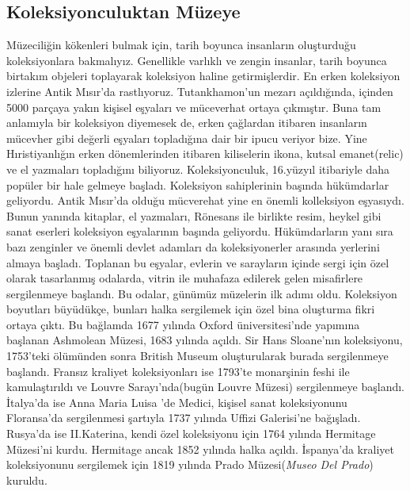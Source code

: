 \subsection{Koleksiyonculuktan Müzeye}
\indent\indent Müzeciliğin kökenleri bulmak için, tarih boyunca insanların oluşturduğu koleksiyonlara bakmalıyız. Genellikle varlıklı ve zengin insanlar, tarih boyunca birtakım objeleri toplayarak koleksiyon haline getirmişlerdir. En erken koleksiyon izlerine Antik Mısır'da rastlıyoruz. Tutankhamon'un mezarı açıldığında, içinden 5000 parçaya yakın kişisel eşyaları ve müceverhat ortaya çıkmıştır. Buna tam anlamıyla bir koleksiyon diyemesek de, erken çağlardan itibaren insanların mücevher gibi değerli eşyaları topladığına dair bir ipucu veriyor bize. Yine Hıristiyanlığın erken dönemlerinden itibaren kiliselerin ikona, kutsal emanet(relic) ve el yazmaları topladığını biliyoruz.\newline
\indent Koleksiyonculuk, 16.yüzyıl itibariyle daha popüler bir hale gelmeye başladı. Koleksiyon sahiplerinin başında hükümdarlar geliyordu. Antik Mısır'da olduğu mücverehat yine en önemli kolleksiyon eşyasıydı. Bunun yanında kitaplar, el yazmaları, Rönesans ile birlikte resim, heykel gibi sanat eserleri koleksiyon eşyalarının başında geliyordu. Hükümdarların yanı sıra bazı zenginler ve önemli devlet adamları da koleksiyonerler arasında yerlerini almaya başladı. Toplanan bu eşyalar, evlerin ve sarayların içinde sergi için özel olarak tasarlanmış odalarda, vitrin ile muhafaza edilerek gelen misafirlere sergilenmeye başlandı. Bu odalar, günümüz müzelerin ilk adımı oldu.\newline
\indent Koleksiyon boyutları büyüdükçe, bunları halka sergilemek için özel bina oluşturma fikri ortaya çıktı. Bu bağlamda 1677 yılında Oxford üniversitesi'nde yapımına başlanan Ashmolean Müzesi, 1683 yılında açıldı. Sir Hans Sloane'nın koleksiyonu, 1753'teki ölümünden sonra British Museum oluşturularak burada sergilenmeye başlandı. Fransız kraliyet koleksiyonları ise 1793'te monarşinin feshi ile kamulaştırıldı ve Louvre Sarayı'nda(bugün Louvre Müzesi) sergilenmeye başlandı. İtalya'da ise Anna Maria Luisa 'de Medici, kişisel sanat koleksiyonunu Floransa'da sergilenmesi şartıyla 1737 yılında Uffizi Galerisi'ne bağışladı. Rusya'da ise II.Katerina, kendi özel koleksiyonu için 1764 yılında Hermitage Müzesi'ni kurdu. Hermitage ancak 1852 yılında halka açıldı. İspanya'da kraliyet koleksiyonunu sergilemek için 1819 yılında Prado Müzesi(\textit{Museo Del Prado}) kuruldu.